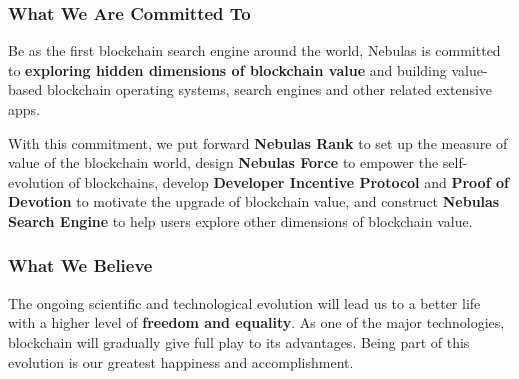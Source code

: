 
\subsubsection*{What We Are Committed To}

Be as the first blockchain search engine around the world, Nebulas is committed to \textbf{exploring hidden dimensions of blockchain value} and building value-based blockchain operating systems, search engines and other related extensive apps.


With this commitment, we put forward \textbf{Nebulas Rank} to set up the measure of value of the blockchain world, design \textbf{Nebulas Force} to empower the self-evolution of blockchains, develop \textbf{Developer Incentive Protocol} and \textbf{Proof of Devotion} to motivate the upgrade of blockchain value, and construct \textbf{Nebulas Search Engine} to help users explore other dimensions of blockchain value.


\subsubsection*{What We Believe}

The ongoing scientific and technological evolution will lead us to a better life with a higher level of \textbf{freedom and equality}. As one of the major technologies, blockchain will gradually give full play to its advantages. Being part of this evolution is our greatest happiness and accomplishment.



